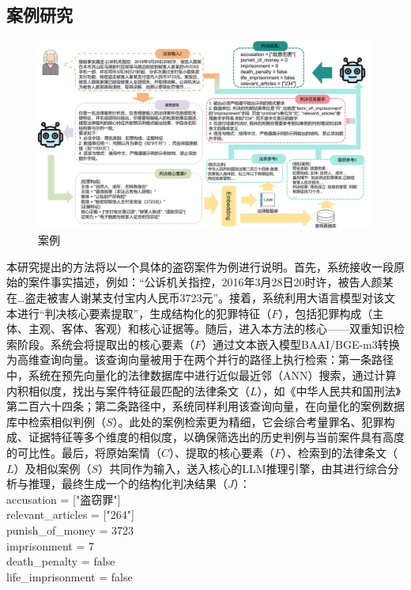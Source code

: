 \subsection{\heiti 案例研究}
\begin{figure}[htpb]
    \centering
    \includegraphics[width=0.8\linewidth]{fig/case.pdf}
    \caption{案例}
    \label{fig:case}
\end{figure}
本研究提出的方法将以一个具体的盗窃案件为例进行说明。首先，系统接收一段原始的案件事实描述，例如：“公诉机关指控，2016年3月28日20时许，被告人颜某在…盗走被害人谢某支付宝内人民币3723元”。接着，系统利用大语言模型对该文本进行“判决核心要素提取”，生成结构化的犯罪特征（$F$），包括犯罪构成（主体、主观、客体、客观）和核心证据等。随后，进入本方法的核心——双重知识检索阶段。系统会将提取出的核心要素（$F$）通过文本嵌入模型BAAI/BGE-m3转换为高维查询向量。该查询向量被用于在两个并行的路径上执行检索：第一条路径中，系统在预先向量化的法律数据库中进行近似最近邻（ANN）搜索，通过计算内积相似度，找出与案件特征最匹配的法律条文（$L$），如《中华人民共和国刑法》第二百六十四条；第二条路径中，系统同样利用该查询向量，在向量化的案例数据库中检索相似判例（$S$）。此处的案例检索更为精细，它会综合考量罪名、犯罪构成、证据特征等多个维度的相似度，以确保筛选出的历史判例与当前案件具有高度的可比性。最后，将原始案情（$C$）、提取的核心要素（$F$）、检索到的法律条文（$L$）及相似案例（$S$）共同作为输入，送入核心的LLM推理引擎，由其进行综合分析与推理，最终生成一个的结构化判决结果（$J$）：
\\
accusation = ["盗窃罪"]
\\
relevant\_articles = ["264"]
\\
punish\_of\_money = 3723
\\
imprisonment = 7
\\
death\_penalty = false
\\
life\_imprisonment = false

